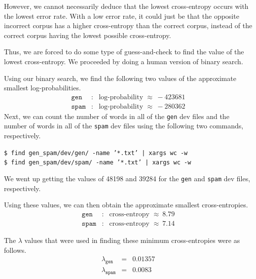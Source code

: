 \documentclass[11pt]{article}
\newcommand{\codebox}[1]{\colorbox{codegray}{\texttt{#1}}}
\begin{document}
\begin{enumerate}
\begin{enumerate}[label=(\alph*)]
		However, we cannot necessarily deduce that the lowest cross-entropy occurs with the lowest error rate. With a low error rate, it could just be that the opposite incorrect corpus has a higher cross-entropy than the correct corpus, instead of the correct corpus having the lowest possible cross-entropy.

		Thus, we are forced to do some type of guess-and-check to find the value of the lowest cross-entropy. We proceeded by doing a human version of binary search. 

		Using our binary search, we find the following two values of the approximate smallest log-probabilities.
		\begin{eqnarray*}
			\texttt{gen} &\colon& \text{log-probability } \approx \ -423681 \\
			\texttt{spam} &\colon& \text{log-probability } \approx \ -280362 
		\end{eqnarray*}
		Next, we can count the number of words in all of the \texttt{gen} dev files and the number of words in all of the \texttt{spam} dev files using the following two commands, respectively. \vspace{4pt}

		\codebox{\$ find gen\_spam/dev/gen/ -name '*.txt' | xargs wc -w \hspace{40mm}} \\
		\codebox{\$ find gen\_spam/dev/spam/ -name '*.txt' | xargs wc -w \hspace{38mm}}

		We went up getting the values of 48198 and 39284 for the \texttt{gen} and \texttt{spam} dev files, respectively. 

		Using these values, we can then obtain the approximate smallest cross-entropies.
		\begin{eqnarray*}
			\texttt{gen} &\colon& \text{cross-entropy } \approx \ 8.79 \\
			\texttt{spam} &\colon& \text{cross-entropy } \approx \ 7.14 
		\end{eqnarray*}

		The $\lambda$ values that were used in finding these minimum cross-entropies were as follows.
		\begin{eqnarray*}
			\lambda_{\texttt{gen}} &=& 0.01357 \\
			\lambda_{\texttt{spam}} &=& 0.0083
		\end{eqnarray*}


\end{enumerate}
\end{enumerate}
\end{document}
